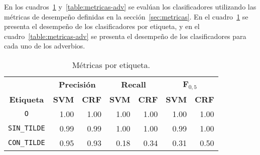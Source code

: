 \documentclass[runningheads,a4paper]{llncs}
\begin{document}
En los cuadros~\ref{table:metricas-generales} y~\ref{table:metricas-adv} se evalúan los clasificadores utilizando las métricas de desempeño definidas en la secci\'on~\ref{sec:metricas}. En el cuadro~\ref{table:metricas-generales} se presenta el desempeño de los clasificadores por etiqueta, y en el cuadro~\ref{table:metricas-adv} se presenta el desempeño de los clasificadores para cada uno de los adverbios.

\begin{table}[ht]
 	\renewcommand{\arraystretch}{1.3}
	\renewcommand{\tabcolsep}{3pt}
	\caption{Métricas por etiqueta.}
	\label{table:metricas-generales}
	\centering
	\begin{tabular}{c r r r r r r}
		\hline
		\multicolumn{1}{c}{} 
			& \multicolumn{2}{c}{\textbf{Precisión}} 
			& \multicolumn{2}{c}{\textbf{Recall}} 
			& \multicolumn{2}{c}{\textbf{F$_{0,5}$}} \\
		\multicolumn{1}{c}{\textbf{Etiqueta}} 
			& \multicolumn{1}{r}{\textbf{SVM}} & \multicolumn{1}{r}{\textbf{CRF}}
			& \multicolumn{1}{r}{\textbf{SVM}} & \multicolumn{1}{r}{\textbf{CRF}}
			& \multicolumn{1}{r}{\textbf{SVM}} & \multicolumn{1}{r}{\textbf{CRF}} \\
		\hline\hline
		\texttt{O} & 1.00 & 1.00 & 1.00 & 1.00 & 1.00 & 1.00 \\
		\texttt{SIN\_TILDE} & 0.99 & 0.99 & 1.00 & 1.00 & 0.99 & 1.00 \\
		\texttt{CON\_TILDE} & 0.95 & 0.93 & 0.18 & 0.34 & 0.31 & 0.50 \\
		\hline
	\end{tabular}
\end{table}
\end{document}
